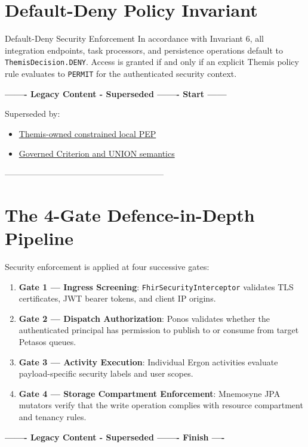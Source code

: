 \section{Default-Deny Policy Invariant}

\begin{principlebox}{Default-Deny Security Enforcement}
In accordance with Invariant 6, all integration endpoints, task processors, and persistence operations default to \texttt{ThemisDecision.DENY}. Access is granted if and only if an explicit Themis policy rule evaluates to \texttt{PERMIT} for the authenticated security context.
\end{principlebox}

\par\noindent\textbf{------- Legacy Content - Superseded ------- Start ------}
\par\noindent Superseded by:
\begin{itemize}
  \item \href{../../markdown/05-information-systems-architecture/component-register.md\#pep-context}{Themis-owned constrained local PEP}
  \item \href{../../markdown/05-information-systems-architecture/component-register.md\#authorisation-criteria}{Governed Criterion and UNION semantics}
\end{itemize}
\noindent ---------------------------------------------------------

\section{The 4-Gate Defence-in-Depth Pipeline}

Security enforcement is applied at four successive gates:
\begin{enumerate}
    \item \textbf{Gate 1 --- Ingress Screening}: \texttt{FhirSecurityInterceptor} validates TLS certificates, JWT bearer tokens, and client IP origins.
    \item \textbf{Gate 2 --- Dispatch Authorization}: Ponos validates whether the authenticated principal has permission to publish to or consume from target Petasos queues.
    \item \textbf{Gate 3 --- Activity Execution}: Individual Ergon activities evaluate payload-specific security labels and user scopes.
    \item \textbf{Gate 4 --- Storage Compartment Enforcement}: Mnemosyne JPA mutators verify that the write operation complies with resource compartment and tenancy rules.
\end{enumerate}


\par\noindent\textbf{------- Legacy Content - Superseded ------- Finish ----}

\newpage
